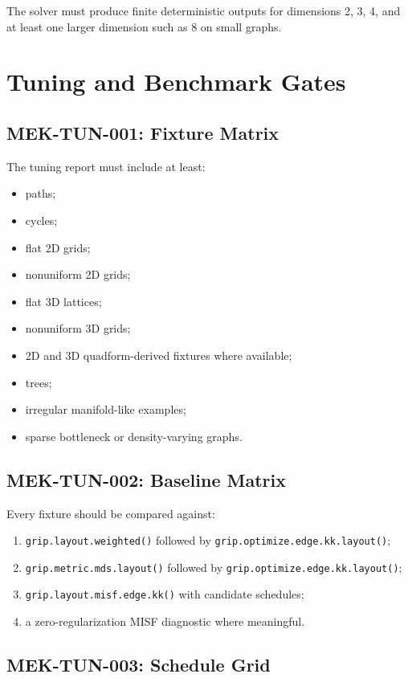 \documentclass[11pt]{article}
\newcommand{\Rfunc}[1]{\texttt{#1}}
\begin{document}
The solver must produce finite deterministic outputs for dimensions 2, 3, 4,
and at least one larger dimension such as 8 on small graphs.

\section{Tuning and Benchmark Gates}

\subsection{MEK-TUN-001: Fixture Matrix}

The tuning report must include at least:
\begin{itemize}[leftmargin=2em]
  \item paths;
  \item cycles;
  \item flat 2D grids;
  \item nonuniform 2D grids;
  \item flat 3D lattices;
  \item nonuniform 3D grids;
  \item 2D and 3D quadform-derived fixtures where available;
  \item trees;
  \item irregular manifold-like examples;
  \item sparse bottleneck or density-varying graphs.
\end{itemize}

\subsection{MEK-TUN-002: Baseline Matrix}

Every fixture should be compared against:
\begin{enumerate}[leftmargin=2em]
  \item \Rfunc{grip.layout.weighted()} followed by
  \Rfunc{grip.optimize.edge.kk.layout()};
  \item \Rfunc{grip.metric.mds.layout()} followed by
  \Rfunc{grip.optimize.edge.kk.layout()};
  \item \Rfunc{grip.layout.misf.edge.kk()} with candidate schedules;
  \item a zero-regularization MISF diagnostic where meaningful.
\end{enumerate}

\subsection{MEK-TUN-003: Schedule Grid}
\end{document}
